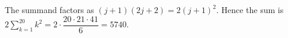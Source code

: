 The summand factors as $(j+1)(2j+2)=2(j+1)^2$. Hence the sum is $2\sum_{k=1}^{20}k^2=2\cdot\dfrac{20\cdot21\cdot41}{6}=\boxed{5740}$.
